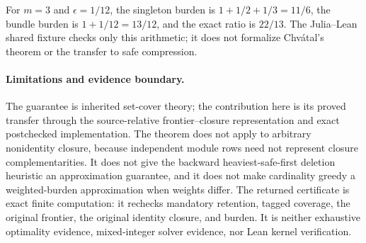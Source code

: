 \begin{example}
\label{ex:aor-greedy-shared-formal-fixture}
For \(m=3\) and \(\epsilon=1/12\), the singleton burden is
\(1+1/2+1/3=11/6\), the bundle burden is \(1+1/12=13/12\), and the exact
ratio is \(22/13\).  The Julia--Lean shared fixture checks only this arithmetic;
it does not formalize Chv\'atal's theorem or the transfer to safe compression.
\end{example}

\paragraph{Limitations and evidence boundary.}
The guarantee is inherited set-cover theory; the contribution here is its
proved transfer through the source-relative frontier--closure representation
and exact postchecked implementation.  The theorem does not apply to
arbitrary nonidentity closure, because independent module rows need not
represent closure complementarities.  It does not give the backward
heaviest-safe-first deletion heuristic an approximation guarantee, and it
does not make cardinality greedy a weighted-burden approximation when weights
differ.  The returned certificate is exact finite computation: it rechecks
mandatory retention, tagged coverage, the original frontier, the original
identity closure, and burden.  It is neither exhaustive optimality evidence,
mixed-integer solver evidence, nor Lean kernel verification.
